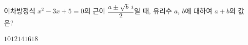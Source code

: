 이차방정식 $x^2-3x+5=0$의 근이 $\dfrac{a\pm\sqrt{b}\,i}{2}$일 때, 유리수 $a$, $b$에 대하여 $a+b$의 값은?
\begin{choices32}{$10$}{$12$}{$14$}{$16$}{$18$}\end{choices32}
